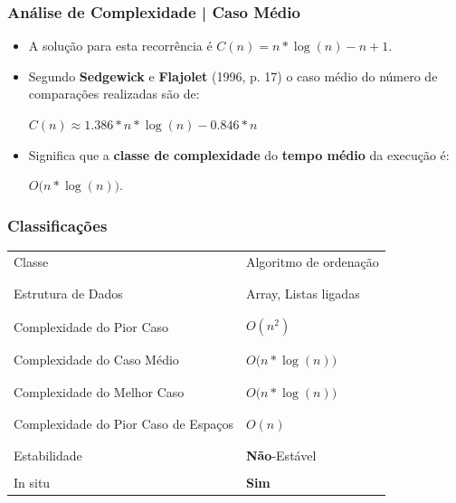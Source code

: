 \documentclass[
	11pt, %
]{beamer}
\begin{document}
\begin{frame}
	\frametitle{Análise de Complexidade | Caso Médio}
	
	{\small
		\begin{itemize}
			\item A solução para esta recorrência é $C(n) = n*\log(n) - n + 1$.
			\item Segundo \textbf{Sedgewick} e \textbf{Flajolet} (1996, p. 17) o caso médio do número de comparações realizadas são de: 
		
			\begin{center}
			$C(n) \approx 1.386 * n*\log(n) - 0.846*n$
			\end{center}
	
			\item Significa que a \textbf{classe de complexidade} do \textbf{tempo médio} da execução é:
			\begin{center}
			$O\bigg(n*\log(n)\bigg)$.
			\end{center}
		\end{itemize}
	}
\end{frame}

\begin{frame}
	\frametitle{Classificações}
	{\tiny
	\begin{table}[]
		\begin{tabular}{l|l}
			Classe & Algoritmo de ordenação \\
			\\ \hline \\
			Estrutura de Dados & Array, Listas ligadas \\
			\\ \hline \\
			Complexidade do Pior Caso & $O(n^{2})$ \\
			\\ \hline \\
			Complexidade do Caso Médio & $O\bigg(n*\log(n)\bigg)$ \\
			\\ \hline \\
			Complexidade do Melhor Caso & $O\bigg(n*\log(n)\bigg)$ \\
			\\ \hline \\
			Complexidade do Pior Caso de Espaços & $O(n)$ \\ 
			\\ \hline \\
			Estabilidade & \textbf{Não}-Estável
			\\ \hline \\
			In situ & \textbf {Sim}
		\end{tabular}
	\end{table}
	}
\end{frame}
\end{document}
